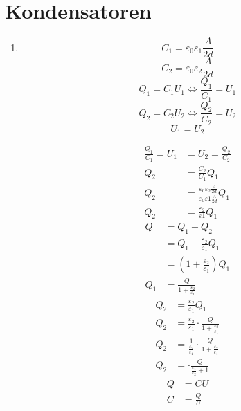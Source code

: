 \documentclass[sectionformat=aufgabe]{gadsescript}
\begin{document}
\maketitle

\section{Kondensatoren}
\begin{enumerate}[label=\alph*)]
	\item 
		\[
			C_1 = \varepsilon_0 \varepsilon_1 \frac{ A }{ 2d }
		\]
		\[
			C_2 = \varepsilon _0 \varepsilon_2 \frac{ A }{ 2d } 
		\]
		\[
			Q_1 = C_1 U_1 \iff  \frac{ Q_1 }{ C_1 } = U_1
		\]
		\[
			Q_2 = C_2 U_2 \iff  \frac{ Q_2 }{ C_2 } = U_2
		\]
		\[
			U_1 = U_2
		\]
		
		\begin{align*}
			\frac{ Q_1 }{ C_1 } = U_1 &= U_2 = \frac{ Q_2 }{ C_2 } \\
			Q_2 &= \frac{ C_2 }{ C_1 } Q_1 \\
			Q_2 &= \frac{ \varepsilon _0 \varepsilon _2 \frac{ A }{ 2d } }{ \varepsilon _0 \varepsilon 1 \frac{ A }{ 2d }  } Q_1 \\
			Q_2 &= \frac{ \varepsilon _2 }{ \varepsilon 1 } Q_1
		\end{align*}
		\begin{align*}
			Q &= Q_1 + Q_2 \\
			~ &= Q_1 + \frac{ \varepsilon _2 }{ \varepsilon _1 } Q_1 \\
			~ &= \left( 1 + \frac{ \varepsilon _2 }{ \varepsilon _1 }  \right) Q_1 \\
			Q_1 &= \frac{ Q }{ 1 + \frac{ \varepsilon _2 }{ \varepsilon _1 }  }
		\end{align*}
		\begin{align*}
			Q_2 &= \frac{ \varepsilon _2 }{ \varepsilon _1 } Q_1 \\
			Q_2 &= \frac{ \varepsilon _2 }{ \varepsilon _1 } \cdot \frac{ Q }{ 1 + \frac{ \varepsilon _2 }{ \varepsilon _1 }  }  \\
			Q_2 &= \frac{ 1 }{ \frac{ \varepsilon _2 }{ \varepsilon _1 } } \cdot \frac{ Q }{ 1 + \frac{ \varepsilon _2 }{ \varepsilon _1 }  }  \\
			Q_2 &= \cdot \frac{ Q }{ \frac{ \varepsilon _1 }{ \varepsilon _2 } + 1  }
		\end{align*}
		\begin{align*}
			Q &=  CU \\
			C &= \frac{ Q }{ U }  \\

\end{align*}
\end{enumerate}
\end{document}
